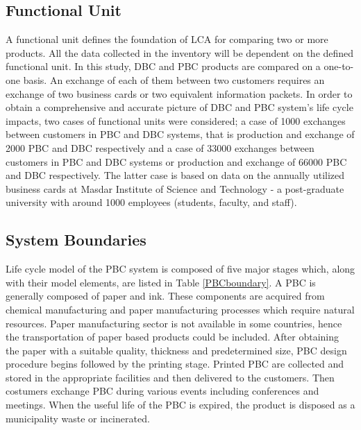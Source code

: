 \documentclass[3p,times,procedia]{elsarticle}
\begin{document}
\subsection{Functional Unit}\label{sec:FunctionalUnit}

A functional unit defines the foundation of LCA for comparing two or more products. All the data collected in the inventory will be dependent on the defined functional unit. In this study, DBC and PBC products are compared on a one-to-one basis. An exchange of each of them between two customers requires an exchange of two business cards or two equivalent information packets. In order to obtain a comprehensive and accurate picture of DBC and PBC system's life cycle impacts, two cases of functional units were considered; a case of 1000 exchanges between customers in PBC and DBC systems, that is production and exchange of 2000 PBC and DBC respectively and a case of 33000 exchanges between customers in PBC and DBC systems or production and exchange of 66000 PBC and DBC respectively. The latter case is based on data on the annually utilized business cards at Masdar Institute of Science and Technology - a post-graduate university with around 1000 employees (students, faculty, and staff).

\subsection{System Boundaries} \label{PBCBoundary}
Life cycle model of the PBC system is composed of five major stages which, along with their model elements, are listed in Table \ref{PBCboundary}. A PBC is generally composed of paper and ink. These components are acquired from chemical manufacturing and paper manufacturing processes which require natural resources. Paper manufacturing sector is not available in some countries, hence the transportation of paper based products could be included. After obtaining the paper with a suitable quality, thickness and predetermined size, PBC design procedure begins followed by the printing stage. Printed PBC are collected and stored in the appropriate facilities and then delivered to the customers. Then costumers exchange PBC during various events including conferences and meetings. When the useful life of the PBC is expired, the product is disposed as a municipality waste or incinerated.
\end{document}
